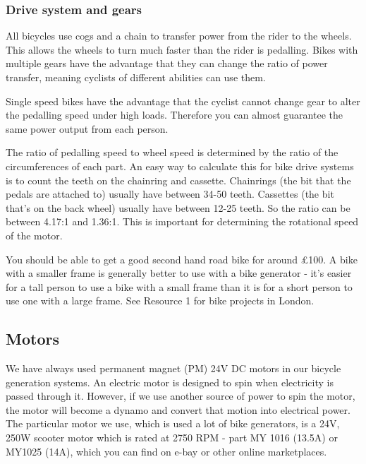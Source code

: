 \documentclass{article}
\theoremstyle{definition}
\theoremstyle{definition}
\theoremstyle{remark}
\begin{document}
    \subsubsection{Drive system and gears} %
    \label{ssub:drive_system_and_gears}

      All bicycles use cogs and a chain to transfer power from the rider to the wheels. This allows the wheels to turn much faster than the rider is pedalling. Bikes with multiple gears have the advantage that they can change the ratio of power transfer, meaning cyclists of different abilities can use them.

      Single speed bikes have the advantage that the cyclist cannot change gear to alter the pedalling speed under high loads. Therefore you can almost guarantee the same power output from each person.

      The ratio of pedalling speed to wheel speed is determined by the ratio of the circumferences of each part. An easy way to calculate this for bike drive systems is to count the teeth on the chainring and cassette. Chainrings (the bit that the pedals are attached to) usually have between 34-50 teeth. Cassettes (the bit that’s on the back wheel) usually have between 12-25 teeth. So the ratio can be between 4.17:1 and 1.36:1.
      This is important for determining the rotational speed of the motor. 

      You should be able to get a good second hand road bike for around £100. A bike with a smaller frame is generally better to use with a bike generator - it’s easier for a tall person to use a bike with a small frame than it is for a short person to use one with a large frame. See Resource 1 for bike projects in London.
    
  

  {\color{blue}\subsection{Motors}} %
  \label{sub:motors}

    We have always used permanent magnet (PM) 24V DC motors in our bicycle generation systems. An electric motor is designed to spin when electricity is passed through it. However, if we use another source of power to spin the motor, the motor will become a dynamo and convert that motion into electrical power. The particular motor we use, which is used a lot of bike generators, is a 24V, 250W scooter motor which is rated at 2750 RPM - part MY 1016 (13.5A) or MY1025 (14A), which you can find on e-bay or other online marketplaces.
\end{document}
